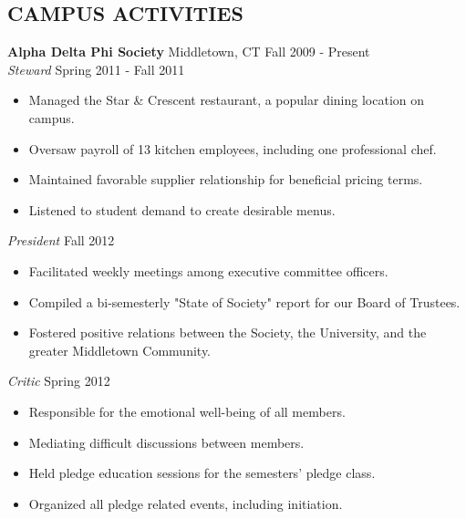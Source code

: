 \documentclass[11pt]{res} %
\begin{document}
\begin{resume}
\vspace{-0.05in} %



\section{CAMPUS ACTIVITIES} 
{\bf Alpha Delta Phi Society} Middletown, CT \hfill Fall 2009 - Present\\
{\it Steward} \hfill Spring 2011 - Fall 2011\\
\vspace{-0.17in}
 \begin{itemize} \itemsep -2pt
   \item Managed the Star \& Crescent restaurant, a popular dining location on
   campus.  
   \item Oversaw payroll of 13 kitchen employees, including one professional 
   chef.  
   \item Maintained favorable supplier relationship for beneficial pricing 
   terms.  
   \item Listened to student demand to create desirable menus.
   \end{itemize}

\vspace{-0.1in}
   
{\it President } \hfill Fall 2012\\
\vspace{-0.17in}
 \begin{itemize} \itemsep -2pt
   \item Facilitated weekly meetings among executive committee officers.
   \item Compiled a bi-semesterly "State of Society" report for our Board of 
   Trustees.
   \item Fostered positive relations between the Society, the University, and 
   the greater Middletown Community.
   \end{itemize}

\vspace{-0.1in}
   
{\it Critic } \hfill Spring 2012\\
\vspace{-0.17in}
 \begin{itemize} \itemsep -2pt
   \item Responsible for the emotional well-being of all members.
   \item Mediating difficult discussions between members.
   \item Held pledge education sessions for the semesters' pledge class.
   \item Organized all pledge related events, including initiation.
   \end{itemize}



\end{resume}
\end{document}
